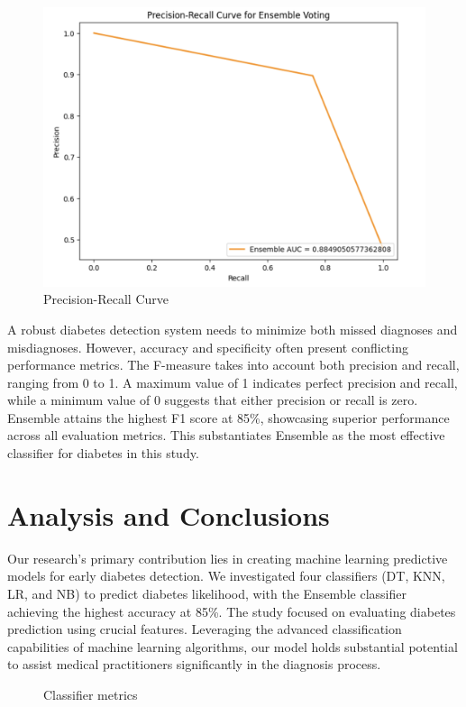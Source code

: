 \documentclass[11pt]{article}
\begin{document}
\begin{figure}
    \centering
    \includegraphics[width=0.5\linewidth]{imageAUC.png}
    \caption{Precision-Recall Curve}
    \label{fig:enter-label}
\end{figure}


A robust diabetes detection system needs to minimize both missed diagnoses and misdiagnoses. However, accuracy and specificity often present conflicting performance metrics. The F-measure takes into account both precision and recall, ranging from 0 to 1. A maximum value of 1 indicates perfect precision and recall, while a minimum value of 0 suggests that either precision or recall is zero. Ensemble attains the highest F1 score at 85\%, showcasing superior performance across all evaluation metrics. This substantiates Ensemble as the most effective classifier for diabetes in this study.

\section{Analysis and Conclusions}
Our research's primary contribution lies in creating machine learning predictive models for early diabetes detection. We investigated four classifiers (DT, KNN, LR, and NB) to predict diabetes likelihood, with the Ensemble classifier achieving the highest accuracy at 85\%. The study focused on evaluating diabetes prediction using crucial features. Leveraging the advanced classification capabilities of machine learning algorithms, our model holds substantial potential to assist medical practitioners significantly in the diagnosis process.

\begin{figure}[h]
\begin{center}
\end{center}
\caption{Classifier metrics}
\label{experiment1fitness}
\end{figure}
\end{document}
